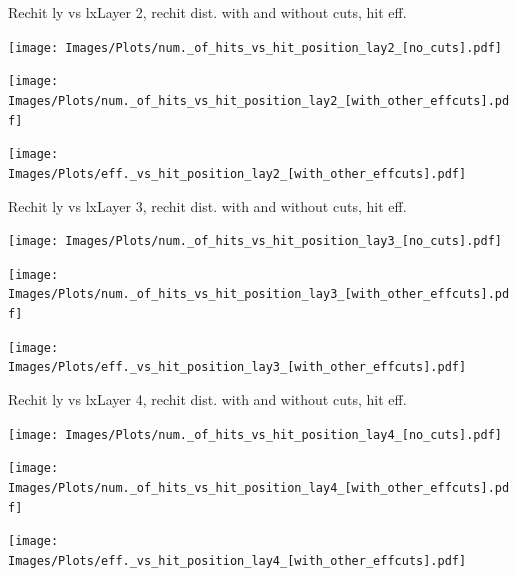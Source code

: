 \documentclass{beamer}
\begin{document}
\begin{frame}{Rechit ly vs lx}{Layer 2, rechit dist. with and without cuts, hit eff.}
  \begin{minipage}{0.32\textwidth}
    \centering
    \texttt{[image: Images/Plots/num.\_of\_hits\_vs\_hit\_position\_lay2\_[no\_cuts].pdf]}
  \end{minipage}%
  \begin{minipage}{0.32\textwidth}
    \centering
    \texttt{[image: Images/Plots/num.\_of\_hits\_vs\_hit\_position\_lay2\_[with\_other\_effcuts].pdf]}
  \end{minipage}%
  \begin{minipage}{0.32\textwidth}
    \centering
    \texttt{[image: Images/Plots/eff.\_vs\_hit\_position\_lay2\_[with\_other\_effcuts].pdf]}
  \end{minipage}
\end{frame}

\begin{frame}{Rechit ly vs lx}{Layer 3, rechit dist. with and without cuts, hit eff.}
  \begin{minipage}{0.32\textwidth}
    \centering
    \texttt{[image: Images/Plots/num.\_of\_hits\_vs\_hit\_position\_lay3\_[no\_cuts].pdf]}
  \end{minipage}%
  \begin{minipage}{0.32\textwidth}
    \centering
    \texttt{[image: Images/Plots/num.\_of\_hits\_vs\_hit\_position\_lay3\_[with\_other\_effcuts].pdf]}
  \end{minipage}%
  \begin{minipage}{0.32\textwidth}
    \centering
    \texttt{[image: Images/Plots/eff.\_vs\_hit\_position\_lay3\_[with\_other\_effcuts].pdf]}
  \end{minipage}
\end{frame}

\begin{frame}{Rechit ly vs lx}{Layer 4, rechit dist. with and without cuts, hit eff.}
  \begin{minipage}{0.32\textwidth}
    \centering
    \texttt{[image: Images/Plots/num.\_of\_hits\_vs\_hit\_position\_lay4\_[no\_cuts].pdf]}
  \end{minipage}%
  \begin{minipage}{0.32\textwidth}
    \centering
    \texttt{[image: Images/Plots/num.\_of\_hits\_vs\_hit\_position\_lay4\_[with\_other\_effcuts].pdf]}
  \end{minipage}%
  \begin{minipage}{0.32\textwidth}
    \centering
    \texttt{[image: Images/Plots/eff.\_vs\_hit\_position\_lay4\_[with\_other\_effcuts].pdf]}
  \end{minipage}
\end{frame}
\end{document}
